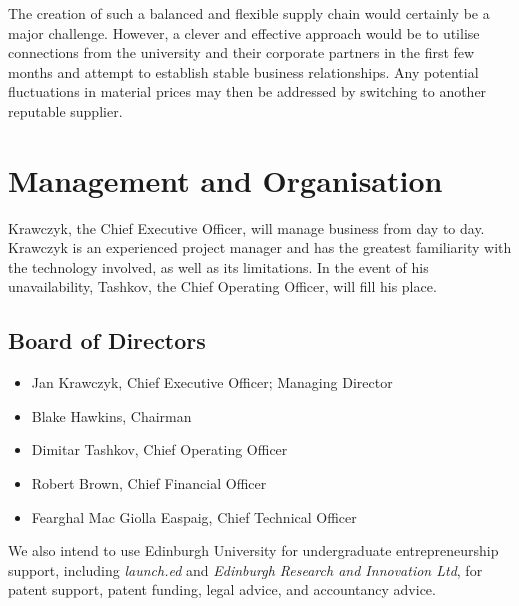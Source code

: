 \documentclass[a4paper,11pt]{article}
\begin{document}
The creation of such a balanced and flexible supply chain would certainly be a major challenge. However, a clever and effective approach would be to utilise connections from the university and their corporate partners in the first few months and attempt to establish stable business relationships. Any potential fluctuations in material prices may then be addressed by switching to another reputable supplier.

\pagebreak

\section{Management and Organisation}
Krawczyk, the Chief Executive Officer, will manage business from day to day. Krawczyk is an experienced project manager and has the greatest familiarity with the technology involved, as well as its limitations. In the event of his unavailability, Tashkov, the Chief Operating Officer, will fill his place.

\subsection{Board of Directors}
\begin{itemize}
	\item Jan Krawczyk, Chief Executive Officer; Managing Director
	\item Blake Hawkins, Chairman
	\item Dimitar Tashkov, Chief Operating Officer
	\item Robert Brown, Chief Financial Officer
	\item Fearghal Mac Giolla Easpaig, Chief Technical Officer
\end{itemize}

We also intend to use Edinburgh University for undergraduate entrepreneurship support, including \textit{launch.ed} and \textit{Edinburgh Research and Innovation Ltd}, for patent support, patent funding, legal advice, and accountancy advice.

\pagebreak
\end{document}
